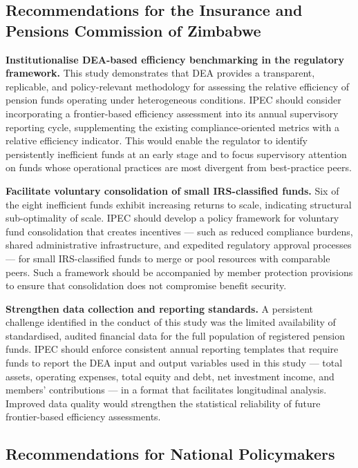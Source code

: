 \documentclass[12pt,a4paper]{article}
\begin{document}
\subsection{Recommendations for the Insurance and Pensions Commission of Zimbabwe}

\textbf{Institutionalise DEA-based efficiency benchmarking in the regulatory framework.} This study demonstrates that DEA provides a transparent, replicable, and policy-relevant methodology for assessing the relative efficiency of pension funds operating under heterogeneous conditions. IPEC should consider incorporating a frontier-based efficiency assessment into its annual supervisory reporting cycle, supplementing the existing compliance-oriented metrics with a relative efficiency indicator. This would enable the regulator to identify persistently inefficient funds at an early stage and to focus supervisory attention on funds whose operational practices are most divergent from best-practice peers.

\textbf{Facilitate voluntary consolidation of small IRS-classified funds.} Six of the eight inefficient funds exhibit increasing returns to scale, indicating structural sub-optimality of scale. IPEC should develop a policy framework for voluntary fund consolidation that creates incentives --- such as reduced compliance burdens, shared administrative infrastructure, and expedited regulatory approval processes --- for small IRS-classified funds to merge or pool resources with comparable peers. Such a framework should be accompanied by member protection provisions to ensure that consolidation does not compromise benefit security.

\textbf{Strengthen data collection and reporting standards.} A persistent challenge identified in the conduct of this study was the limited availability of standardised, audited financial data for the full population of registered pension funds. IPEC should enforce consistent annual reporting templates that require funds to report the DEA input and output variables used in this study --- total assets, operating expenses, total equity and debt, net investment income, and members' contributions --- in a format that facilitates longitudinal analysis. Improved data quality would strengthen the statistical reliability of future frontier-based efficiency assessments.

\subsection{Recommendations for National Policymakers}
\end{document}
